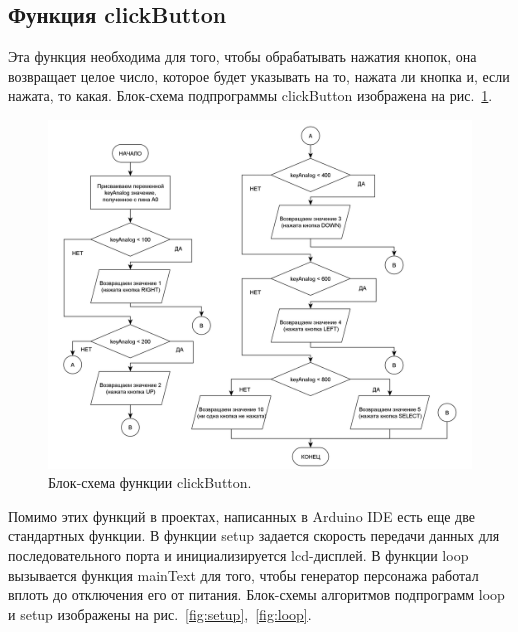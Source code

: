\subsection*{Функция clickButton}

Эта функция необходима для того, чтобы обрабатывать нажатия кнопок, она возвращает целое число, которое будет указывать на то, нажата ли кнопка и, если нажата, то какая. Блок-схема подпрограммы clickButton изображена на рис.~\ref{fig:click}.

\begin{figure}[H]
    \centering
    \includegraphics[scale=0.75]{clickButton.png}
    \caption{Блок-схема функции clickButton.}
    \label{fig:click}
\end{figure}

Помимо этих функций в проектах, написанных в Arduino IDE есть еще две стандартных функции. В функции setup задается скорость передачи данных для последовательного порта и инициализируется lcd-дисплей. В функции loop вызывается функция mainText для того, чтобы генератор персонажа работал вплоть до отключения его от питания. Блок-схемы алгоритмов подпрограмм loop и setup изображены на рис.~\ref{fig:setup},~\ref{fig:loop}.

